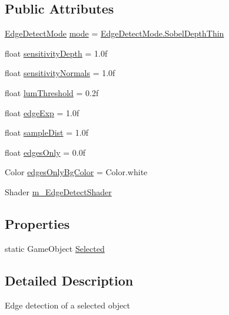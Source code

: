 \subsection*{Public Attributes}
\begin{DoxyCompactItemize}
\item 
\mbox{\hyperlink{class_highlighter_a585a556fee5d14c362fbf2fada52a073}{Edge\+Detect\+Mode}} \mbox{\hyperlink{class_highlighter_ab7cc5f640025462979c4da50a25c0e4e}{mode}} = \mbox{\hyperlink{class_highlighter_a585a556fee5d14c362fbf2fada52a073a98e5dbe639f7850feb04dce03f5744ee}{Edge\+Detect\+Mode.\+Sobel\+Depth\+Thin}}
\item 
float \mbox{\hyperlink{class_highlighter_ab70ef9aa8d5990cf204dc0b24fa0de08}{sensitivity\+Depth}} = 1.\+0f
\item 
float \mbox{\hyperlink{class_highlighter_a6264ca2df3047dcdd093f10b9d79e9e4}{sensitivity\+Normals}} = 1.\+0f
\item 
float \mbox{\hyperlink{class_highlighter_aeebc3e4c2907593c7ee658d59dfbae3e}{lum\+Threshold}} = 0.\+2f
\item 
float \mbox{\hyperlink{class_highlighter_a0ce6d93b0f65254716c281190cdcabba}{edge\+Exp}} = 1.\+0f
\item 
float \mbox{\hyperlink{class_highlighter_af924ebf1c49c5adf1851234227bcc72d}{sample\+Dist}} = 1.\+0f
\item 
float \mbox{\hyperlink{class_highlighter_ad170e81e5dfed244569decba30ef16e8}{edges\+Only}} = 0.\+0f
\item 
Color \mbox{\hyperlink{class_highlighter_a2e2166dbb3233abd802cc464f2055fea}{edges\+Only\+Bg\+Color}} = Color.\+white
\item 
Shader \mbox{\hyperlink{class_highlighter_a8c79a2a4ac04780d9df045df1ea7f025}{m\+\_\+\+Edge\+Detect\+Shader}}
\end{DoxyCompactItemize}
\subsection*{Properties}
\begin{DoxyCompactItemize}
\item 
static Game\+Object \mbox{\hyperlink{class_highlighter_a3c59790cacc8f5149a3a642f67cd1168}{Selected}}
\end{DoxyCompactItemize}


\subsection{Detailed Description}
Edge detection of a selected object 

